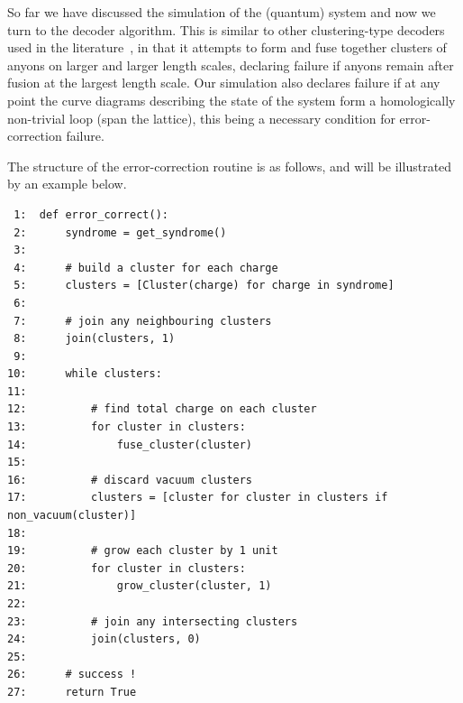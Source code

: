 \documentclass[aps, letterpaper, onecolumn, superscriptaddress, notitlepage, 10pt]{revtex4-1}
\begin{document}
So far we have discussed the simulation of the (quantum) system
and now we turn to the decoder algorithm. This is similar to other clustering-type decoders used in the literature~\cite{Bravyi2011}, in that it attempts to form and fuse together clusters of anyons on larger and larger length scales, declaring failure if anyons remain after fusion at the largest length scale. Our simulation also declares failure if at any point the curve diagrams describing the state of the system form a homologically non-trivial loop (span the lattice), this being a necessary condition for error-correction failure.

The structure of the error-correction routine is as follows, and will be illustrated by an example below.

\begin{verbatim}
 1:  def error_correct():
 2:      syndrome = get_syndrome()
 3:      
 4:      # build a cluster for each charge
 5:      clusters = [Cluster(charge) for charge in syndrome]
 6:  
 7:      # join any neighbouring clusters
 8:      join(clusters, 1)
 9:      
10:      while clusters:
11:      
12:          # find total charge on each cluster
13:          for cluster in clusters:
14:              fuse_cluster(cluster)
15:      
16:          # discard vacuum clusters
17:          clusters = [cluster for cluster in clusters if non_vacuum(cluster)]
18:      
19:          # grow each cluster by 1 unit
20:          for cluster in clusters:
21:              grow_cluster(cluster, 1)
22:      
23:          # join any intersecting clusters
24:          join(clusters, 0)
25:  
26:      # success !
27:      return True
\end{verbatim} %
\end{document}
